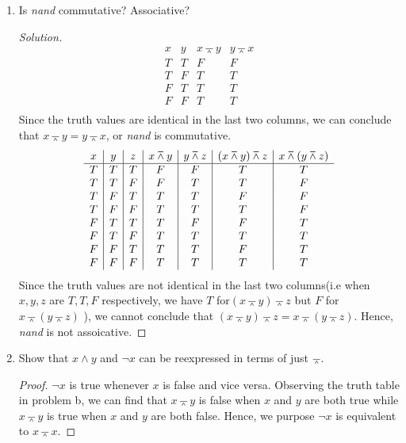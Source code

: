 \documentclass[12pt]{article}
\renewcommand\qedsymbol{$\blacksquare$}
\newenvironment{solution}
{\begin{proof}[Solution]\renewcommand\qedsymbol{$\square$}}
	{\end{proof}}
\begin{document}
\begin{enumerate}
\begin{enumerate}
\begin{solution}
		\end{solution}
		\item Is \emph{nand} commutative? Associative?
		\begin{solution}
			\begin{displaymath}
			\begin{array}{c|c|c|c}
				x & y & x \barwedge y& y \barwedge x\\
				\hline  
				T & T &F&F\\
				T & F &T&T\\ 
				F & T &T&T\\
				F & F &T&T\\
			\end{array}	
		\end{displaymath}
		Since the truth values are identical in the last two columns, we can conclude that $ x \barwedge y = y \barwedge x$, or  \emph{nand} is commutative.
			\begin{displaymath}
		\begin{array}{c| c| c|c|c|c|c}
			x & y & z & x \barwedge y & y \barwedge z & (x \barwedge y) \barwedge z & x \barwedge (y \barwedge z) \\ %
			\hline  %
			T & T & T&F&F &T&T\\
			T & T & F &F &T&T&F\\
			T & F & T &T &T&F&F\\
			T & F & F &T &T&T&F\\
			F & T & T&T&F&F&T\\
			F & T & F &T&T&T&T\\
			F & F & T &T & T&F&T\\
			F & F & F &T &T&T&T\\
		\end{array}	
	\end{displaymath}
		Since the truth values are not identical in the last two columns(i.e when $x,y,z$ are $T,T,F$ respectively, we have $T$ for$(x \barwedge y) \barwedge z$ but $F$ for $ x \barwedge (y \barwedge z)$ ), we cannot conclude that $ (x \barwedge y) \barwedge z = x \barwedge (y \barwedge z)$. Hence,  \emph{nand} is not assoicative.
				\end{solution}
		\item Show that $x \land y$ and $\lnot x$ can be reexpressed in terms of just $\barwedge$.
		\begin{proof}
			$\lnot x$ is true whenever $x$ is false and vice versa. Observing the truth table in problem b, we can find that $x \barwedge y$ is  false when $x$ and $y$ are both true while  $x \barwedge y$ is  true when $x$ and $y$ are both false. Hence, we purpose	$\lnot x$ is equivalent to $x \barwedge x$.
		

\end{proof}
\end{enumerate}
\end{enumerate}
\end{document}
